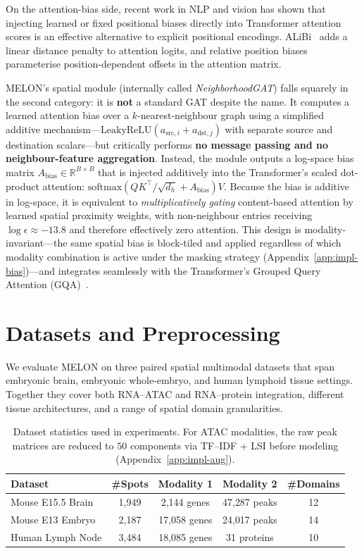 \documentclass{article}
\theoremstyle{plain}
\theoremstyle{definition}
\begin{document}
On the attention-bias side, recent work in NLP and vision has shown that injecting learned or fixed positional biases directly into Transformer attention scores is an effective alternative to explicit positional encodings. ALiBi~\cite{press2022train} adds a linear distance penalty to attention logits, and relative position biases~\cite{raffel2020exploring,shaw2018self} parameterise position-dependent offsets in the attention matrix.

MELON's spatial module (internally called \emph{NeighborhoodGAT}) falls squarely in the second category: it is \textbf{not} a standard GAT despite the name. It computes a learned attention bias over a $k$-nearest-neighbour graph using a simplified additive mechanism---$\mathrm{LeakyReLU}(a_{\text{src},i} + a_{\text{dst},j})$ with separate source and destination scalars---but critically performs \textbf{no message passing and no neighbour-feature aggregation}. Instead, the module outputs a log-space bias matrix $A_{\text{bias}} \in \mathbb{R}^{B \times B}$ that is injected additively into the Transformer's scaled dot-product attention: $\mathrm{softmax}(QK^\top/\sqrt{d_h} + A_{\text{bias}})V$. Because the bias is additive in log-space, it is equivalent to \emph{multiplicatively gating} content-based attention by learned spatial proximity weights, with non-neighbour entries receiving $\log\epsilon \approx -13.8$ and therefore effectively zero attention. This design is modality-invariant---the same spatial bias is block-tiled and applied regardless of which modality combination is active under the masking strategy (Appendix~\ref{app:impl-bias})---and integrates seamlessly with the Transformer's Grouped Query Attention (GQA)~\cite{ainslie2023gqa}.

\section{Datasets and Preprocessing}\label{app:datasets}

We evaluate MELON on three paired spatial multimodal datasets that span embryonic brain, embryonic whole-embryo, and human lymphoid tissue settings. Together they cover both RNA--ATAC and RNA--protein integration, different tissue architectures, and a range of spatial domain granularities.

\begin{table}[H]
\centering
\caption{Dataset statistics used in experiments. For ATAC modalities, the raw peak matrices are reduced to $50$ components via TF--IDF + LSI before modeling (Appendix~\ref{app:impl-aug}).}
\label{tab:dataset-stats}
\small
\begin{tabular}{lcccc}
\toprule
Dataset & \#Spots & Modality 1 & Modality 2 & \#Domains \\
\midrule
Mouse E15.5 Brain & 1{,}949 & 2{,}144 genes & 47{,}287 peaks & 12 \\
Mouse E13 Embryo & 2{,}187 & 17{,}058 genes & 24{,}017 peaks & 14 \\
Human Lymph Node & 3{,}484 & 18{,}085 genes & 31 proteins & 10 \\
\bottomrule
\end{tabular}
\end{table}
\end{document}
